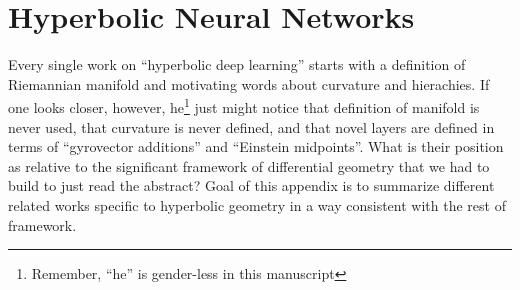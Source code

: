 \chapter{Hyperbolic Neural Networks}

Every single work on ``hyperbolic deep learning'' starts with a definition of
Riemannian manifold and motivating words about curvature and hierachies. If one
looks closer, however, he\footnote{Remember, ``he'' is gender-less in this
manuscript} just might notice that definition of manifold is never used, that
curvature is never defined, and that novel layers are defined in terms of
``gyrovector additions'' and ``Einstein midpoints''. What is their position as
relative to the significant framework of differential geometry that we had to
build to just read the abstract? Goal of this appendix is to summarize
different related works specific to hyperbolic geometry in a way consistent
with the rest of framework.
